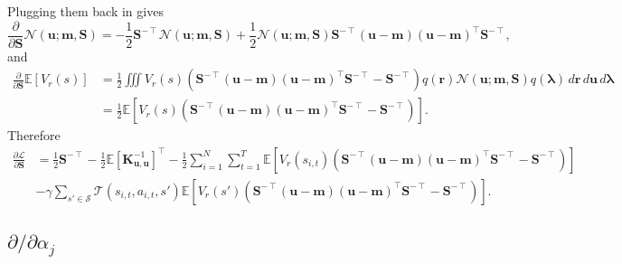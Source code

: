 \documentclass{article}
\theoremstyle{definition}
\newcommand{\Kuu}{\mathbf{K}_{\mathbf{u},\mathbf{u}}}
\newcommand{\dS}{\frac{\partial}{\partial\mathbf{S}}}
\begin{document}
Plugging them back in gives
\[ \dS\mathcal{N}(\mathbf{u}; \mathbf{m}, \mathbf{S}) =
  -\frac{1}{2}\mathbf{S}^{-\intercal}\mathcal{N}(\mathbf{u};
  \mathbf{m}, \mathbf{S}) + \frac{1}{2}\mathcal{N}(\mathbf{u}; \mathbf{m},
  \mathbf{S})\mathbf{S}^{-\intercal}(\mathbf{u} - \mathbf{m})(\mathbf{u} -
  \mathbf{m})^\intercal\mathbf{S}^{-\intercal}, \]
and
\[
  \begin{split}
    \dS\mathbb{E}[V_r(s)] &= \frac{1}{2}\iiint V_r(s)
    (\mathbf{S}^{-\intercal}(\mathbf{u} - \mathbf{m})(\mathbf{u} -
    \mathbf{m})^\intercal\mathbf{S}^{-\intercal} - \mathbf{S}^{-\intercal})
    q(\mathbf{r}) \mathcal{N}(\mathbf{u};
    \mathbf{m}, \mathbf{S}) q(\bm\lambda)\,d\mathbf{r}\,d\mathbf{u}\,d\bm\lambda
    \\
    &= \frac{1}{2}\mathbb{E}[V_r(s)(\mathbf{S}^{-\intercal}(\mathbf{u} -
    \mathbf{m})(\mathbf{u} - \mathbf{m})^\intercal\mathbf{S}^{-\intercal} -
    \mathbf{S}^{-\intercal})].
  \end{split}
\]
Therefore
\[
  \begin{split}
    \frac{\partial\mathcal{L}}{\partial\mathbf{S}} &=
    \frac{1}{2}\mathbf{S}^{-\intercal} -
    \frac{1}{2}\mathbb{E}[\Kuu^{-1}]^\intercal - \frac{1}{2}
    \sum_{i=1}^N\sum_{t=1}^T
    \mathbb{E}[V_r(s_{i,t})(\mathbf{S}^{-\intercal}(\mathbf{u} -
    \mathbf{m})(\mathbf{u} - \mathbf{m})^\intercal\mathbf{S}^{-\intercal} -
    \mathbf{S}^{-\intercal})] \\
    &- \gamma\sum_{s' \in \mathcal{S}}\mathcal{T}(s_{i,t}, a_{i,t}, s')
    \mathbb{E}[V_r(s')(\mathbf{S}^{-\intercal}(\mathbf{u} -
    \mathbf{m})(\mathbf{u} - \mathbf{m})^\intercal\mathbf{S}^{-\intercal} -
    \mathbf{S}^{-\intercal})].
  \end{split}
\]

\subsection{$\partial/\partial\alpha_j$}
\end{document}
